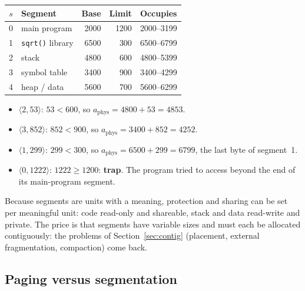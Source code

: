 \documentclass[11pt,a4paper]{article}
\begin{document}
\begin{example}
\begin{center}
\renewcommand{\arraystretch}{1.2}
\begin{tabular}{@{}clrrl@{}}
\toprule
$s$ & \textbf{Segment} & \textbf{Base} & \textbf{Limit} & \textbf{Occupies} \\
\midrule
0 & main program & 2000 & 1200 & 2000--3199 \\
1 & \texttt{sqrt()} library & 6500 & 300 & 6500--6799 \\
2 & stack & 4800 & 600 & 4800--5399 \\
3 & symbol table & 3400 & 900 & 3400--4299 \\
4 & heap / data & 5600 & 700 & 5600--6299 \\
\bottomrule
\end{tabular}
\end{center}
\begin{itemize}
  \item $\langle 2, 53\rangle$: $53 < 600$, so $a_{\text{phys}} = 4800 + 53 = 4853$.
  \item $\langle 3, 852\rangle$: $852 < 900$, so $a_{\text{phys}} = 3400 + 852 = 4252$.
  \item $\langle 1, 299\rangle$: $299 < 300$, so $a_{\text{phys}} = 6500 + 299 = 6799$, the last byte of segment~1.
  \item $\langle 0, 1222\rangle$: $1222 \ge 1200$: \textbf{trap}. The program tried to access beyond the end of its main-program segment.
\end{itemize}
\end{example}

Because segments are units with a meaning, protection and sharing can be set per meaningful unit: code read-only and shareable, stack and data read-write and private. The price is that segments have variable sizes and must each be allocated contiguously: the problems of Section~\ref{sec:contig} (placement, external fragmentation, compaction) come back.

\subsection{Paging versus segmentation}
\end{document}
